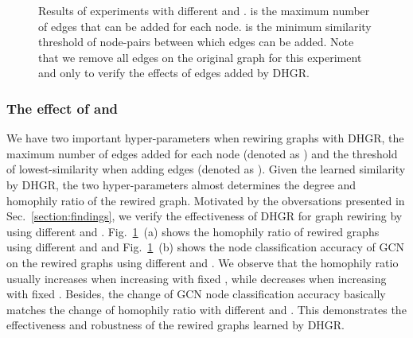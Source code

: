 \documentclass[sigconf]{acmart}
\begin{document}
	
	\begin{figure}[h]
		\begin{minipage}[t]{0.5\linewidth}
			\centering
\end{minipage}\begin{minipage}[t]{0.5\linewidth}
			\centering
		\end{minipage}
		\caption{Results of experiments with different  and .  is the maximum number of edges that can be added for each node.  is the minimum similarity threshold of node-pairs between which edges can be added. Note that we remove all edges on the original graph for this experiment and only to verify the effects of edges added by DHGR.}
		
		\label{fig:heat_k_epsilon}
	\end{figure}
	\subsubsection{The effect of   and }
	We have two important hyper-parameters when rewiring graphs with DHGR, the maximum number of edges added for each node (denoted as  ) and the threshold of lowest-similarity when adding edges (denoted as ). Given the learned similarity by DHGR, the two hyper-parameters almost determines the degree and homophily ratio of the rewired graph. Motivated by the obversations presented in Sec.~\ref{section:findings}, we verify the effectiveness of DHGR for graph rewiring by using different  and . Fig.~\ref{fig:heat_k_epsilon}~(a) shows the homophily ratio of rewired graphs using different  and  and Fig.~\ref{fig:heat_k_epsilon}~(b) shows the node classification accuracy of GCN on the rewired graphs using different  and . We observe that the homophily ratio usually increases when increasing  with fixed , while decreases when increasing  with fixed . Besides, the change of GCN node classification accuracy basically matches the change of homophily ratio with different  and . This demonstrates the effectiveness and robustness of the rewired graphs learned by DHGR.
\end{document}
